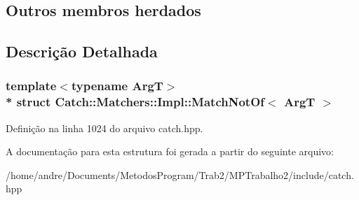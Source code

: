 \subsection*{Outros membros herdados}


\subsection{Descrição Detalhada}
\subsubsection*{template$<$typename ArgT$>$\\*
struct Catch\+::\+Matchers\+::\+Impl\+::\+Match\+Not\+Of$<$ Arg\+T $>$}



Definição na linha 1024 do arquivo catch.\+hpp.



A documentação para esta estrutura foi gerada a partir do seguinte arquivo\+:\begin{DoxyCompactItemize}
\item 
/home/andre/\+Documents/\+Metodos\+Program/\+Trab2/\+M\+P\+Trabalho2/include/catch.\+hpp\end{DoxyCompactItemize}
